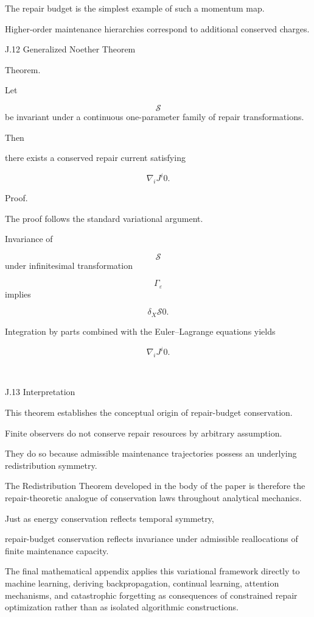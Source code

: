 \documentclass[12pt,oneside]{article}
\theoremstyle{plain}
\theoremstyle{definition}
\theoremstyle{remark}
\begin{document}
The repair budget is the simplest example of such a momentum map.

Higher-order maintenance hierarchies correspond to additional conserved charges.


J.12 Generalized Noether Theorem

Theorem.

Let

\[
\mathcal S
\]
be invariant under a continuous one-parameter family of repair transformations.

Then

there exists a conserved repair current satisfying

\[
\nabla_iJ^i
0. 

\]

Proof.

The proof follows the standard variational argument.

Invariance of

\[
\mathcal S
\]
under infinitesimal transformation

\[
\Gamma_\varepsilon
\]
implies

\[
\delta_X
\mathcal S
0. 

\]

Integration by parts combined with the Euler–Lagrange equations yields

\[
\nabla_iJ^i
0. 

\]

\square


J.13 Interpretation

This theorem establishes the conceptual origin of repair-budget conservation.

Finite observers do not conserve repair resources by arbitrary assumption.

They do so because admissible maintenance trajectories possess an underlying redistribution symmetry.

The Redistribution Theorem developed in the body of the paper is therefore the repair-theoretic analogue of conservation laws throughout analytical mechanics.

Just as energy conservation reflects temporal symmetry,

repair-budget conservation reflects invariance under admissible reallocations of finite maintenance capacity.

The final mathematical appendix applies this variational framework directly to machine learning, deriving backpropagation, continual learning, attention mechanisms, and catastrophic forgetting as consequences of constrained repair optimization rather than as isolated algorithmic constructions.
\end{document}
